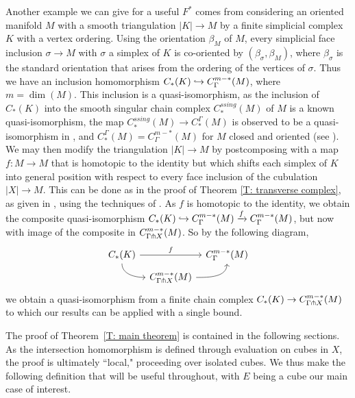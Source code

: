 Another example we can give for a useful $F^*$ comes from considering an oriented manifold $M$ with a smooth triangulation $|K|\to M$ by a finite simplicial complex $K$ with a vertex ordering. 
Using the orientation $\beta_M$ of $M$, every simplicial face inclusion $\sigma\to M$ with $\sigma$ a simplex of $K$ is co-oriented by $(\beta_\sigma,\beta_M)$, where $\beta_\sigma$ is the standard orientation that arises from the ordering of the vertices of $\sigma$. 
Thus we have an inclusion homomorphism $C_*(K)\hookrightarrow C^{m-*}_\Gamma(M)$, where $m = \dim(M)$.
This inclusion is a quasi-isomorphism, as the inclusion of $C_*(K)$ into the smooth singular chain complex $C_*^{ssing}(M)$ of $M$ is a known quasi-isomorphism, the map $C_*^{ssing}(M) \to C_*^\Gamma(M)$ is observed to be a quasi-isomorphism in \cite[Section 10]{Lipy14}, and $C_*^\Gamma(M)=C^{m-*}_\Gamma(M)$ for $M$ closed and oriented (see \cite[Section 12]{Lipy14}). 
We may then modify the triangulation $|K|\to M$ by postcomposing with a map $f \colon M\to M$ that is homotopic to the identity but which shifts each simplex of $K$ into general position with respect to every face inclusion of the cubulation $|X|\to M$.
This can be done as in the proof of Theorem \ref{T: transverse complex}, as given in \cite{FMS-foundations}, using the techniques of \cite[Section 2.3]{GuPo74}.
As $f$ is homotopic to the identity, we obtain the composite quasi-isomorphism $C_*(K)\hookrightarrow C^{m-*}_\Gamma(M) \xrightarrow{f} C^{m-*}_\Gamma(M)$, but now with image of the composite in $C^{m-*}_{\Gamma \pitchfork X}(M)$. So by the following diagram,
\begin{equation*}
\begin{tikzcd}[column sep=tiny, row sep=tiny]
C_*(K) \arrow[rr, "f"] \arrow[dr, out=-90, in=180]& & C^{m-*}_{\Gamma}(M) \\
& C^{m-*}_{\Gamma \pf X}(M) \arrow[ur, out=0, in =-90] &
\end{tikzcd}
\end{equation*}
we obtain a quasi-isomorphism from a finite chain complex $C_*(K)\to C^{m-*}_{\Gamma \pitchfork X}(M)$ to which our results can be applied with a single bound.

\bigskip

The proof of Theorem~\ref{T: main theorem} is contained in the following sections. 
As the intersection homomorphism is defined through evaluation on cubes in $X$, the proof 
is ultimately ``local," proceeding over isolated cubes.
We thus make the following definition that will be useful throughout, with $E$ being a cube our main case of interest.

